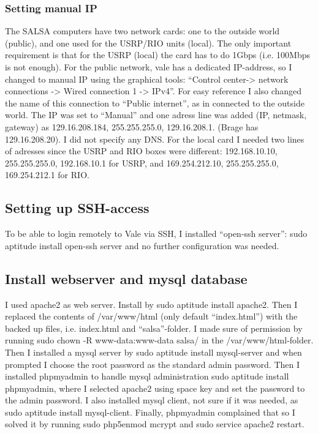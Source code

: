 \subsubsection{Setting manual IP}
The SALSA computers have two network cards: one to the outside world (public),
and one used for the USRP/RIO units (local). The only important requirement is
that for the USRP (local) the card has to do 1Gbps (i.e. 100Mbps is not
enough). For the public network, vale has a dedicated IP-address, so I changed
to manual IP using the graphical tools: “Control center-> network connections
-> Wired connection 1 -> IPv4”. For easy reference I also changed the name of
this connection to “Public internet”, as in connected to the outside world. The
IP was set to “Manual” and one adress line was added (IP, netmask, gateway) as
129.16.208.184, 255.255.255.0, 129.16.208.1. (Brage has 129.16.208.20). I did
not specify any DNS. For the local card I needed two lines of adresses since
the USRP and RIO boxes were different: 192.168.10.10, 255.255.255.0,
192.168.10.1 for USRP, and 169.254.212.10, 255.255.255.0, 169.254.212.1 for
RIO.  

\subsection{Setting up SSH-access}
To be able to login remotely to Vale via SSH, I installed “open-ssh server”:
sudo aptitude install open-ssh server and no further configuration was needed. 
\subsection{Install webserver and mysql database}
I used apache2 as web server. Install by sudo aptitude install apache2. Then I
replaced the contents of  /var/www/html (only default “index.html”) with the
backed up files, i.e. index.html and “salsa”-folder. I made sure of permission
by running sudo chown -R www-data:www-data salsa/ in the /var/www/html-folder.
Then I installed a mysql server by sudo aptitude install mysql-server and when
prompted I choose the root password as the standard admin password. Then
I installed phpmyadmin to handle mysql administration sudo aptitude install
phpmyadmin, where I selected apache2 using space key and set the password to
the admin password. I also installed mysql client, not sure if it was
needed, as sudo aptitude install mysql-client. Finally, phpmyadmin complained
that so I solved it by running sudo php5enmod mcrypt and sudo service apache2
restart.  
